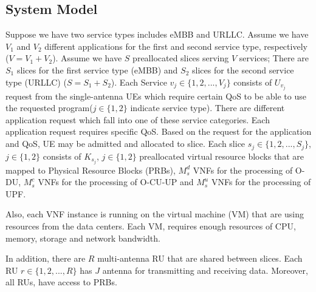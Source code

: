 \documentclass[conference]{IEEEtran}
\begin{document}
\subsection{System Model}
Suppose we have two service types includes eMBB and URLLC. Assume we have $V_1$ and $V_2$ different applications for the first and second service type, respectively ($V = V_1 + V_2$).
Assume we have $S$ preallocated slices serving $V$ services; There are $S_1$ slices for the first service type (eMBB) and $S_2$ slices for the second service type (URLLC) ($S = S_1 + S_2$).
Each Service $v_j\in \{1,2,...,V_j \} $ consists of $U_{v_j}$ request from the 
single-antenna UEs which require certain QoS to be able to use the requested program($j \in \{1,2\}$ indicate service type).
There are different application request which fall into one of these service categories. Each application request requires specific QoS. Based on the request for the application and QoS, UE may be admitted and allocated to slice.
Each slice $s_j \in \{1,2,...,S_j \}$, $j \in \{1,2\}$ consists of $K_{s_j}$, $j \in \{1,2\}$ preallocated virtual resource blocks that are mapped to Physical Resource Blocks (PRBs), $M_s^{d}$ VNFs for the processing of O-DU,  $M_s^{c}$ VNFs for the processing of O-CU-UP and $M_s^{u}$ VNFs for the processing of UPF.

Also, each VNF instance is running on the virtual machine (VM) that are using resources from the data centers. Each VM, requires enough resources of CPU, memory, storage and network bandwidth.

In addition, there are $R$ multi-antenna RU that are shared between slices. Each RU $r \in \{1,2,...,R \}$
has $J$ antenna for transmitting and receiving data. Moreover, all RUs, have access to PRBs.
\end{document}

